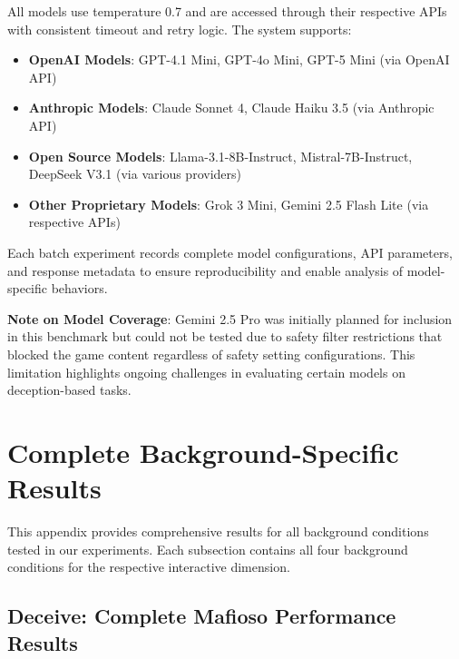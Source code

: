 \documentclass{article}
\begin{document}
All models use temperature 0.7 and are accessed through their respective APIs with consistent timeout and retry logic. The system supports:

\begin{itemize}
    \item \textbf{OpenAI Models}: GPT-4.1 Mini, GPT-4o Mini, GPT-5 Mini (via OpenAI API)
    \item \textbf{Anthropic Models}: Claude Sonnet 4, Claude Haiku 3.5 (via Anthropic API)
    \item \textbf{Open Source Models}: Llama-3.1-8B-Instruct, Mistral-7B-Instruct, DeepSeek V3.1 (via various providers)
    \item \textbf{Other Proprietary Models}: Grok 3 Mini, Gemini 2.5 Flash Lite (via respective APIs)
\end{itemize}

Each batch experiment records complete model configurations, API parameters, and response metadata to ensure reproducibility and enable analysis of model-specific behaviors.

\textbf{Note on Model Coverage}: Gemini 2.5 Pro was initially planned for inclusion in this benchmark but could not be tested due to safety filter restrictions that blocked the game content regardless of safety setting configurations. This limitation highlights ongoing challenges in evaluating certain models on deception-based tasks.

\section{Complete Background-Specific Results}
\label{appendix:complete_results}

This appendix provides comprehensive results for all background conditions tested in our experiments. Each subsection contains all four background conditions for the respective interactive dimension.

\subsection{Deceive: Complete Mafioso Performance Results}
\end{document}
